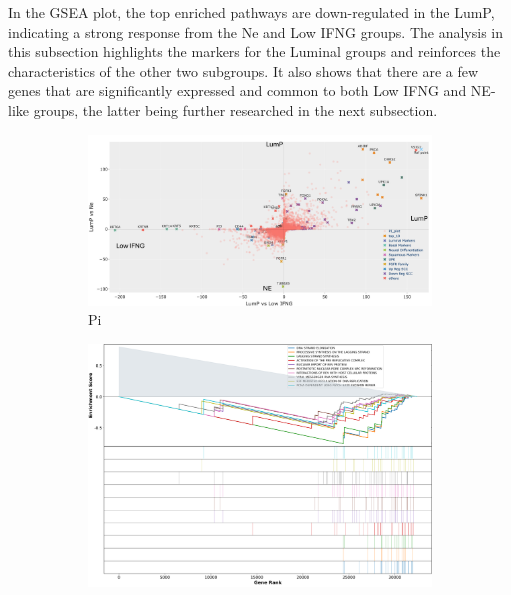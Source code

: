 In the GSEA plot, the top enriched pathways are down-regulated in the LumP, indicating a strong response from the Ne and Low IFNG groups. The analysis in this subsection highlights the markers for the Luminal groups and reinforces the characteristics of the other two subgroups. It also shows that there are a few genes that are significantly expressed and common to both Low IFNG and NE-like groups, the latter being further researched in the next subsection.

\begin{figure}[H]
    \centering
    \captionsetup{font=small} 
    \begin{subfigure}[!t]{1.0\textwidth}
        \includegraphics[width=\textwidth,keepaspectratio]{Sections/ClusteringAnalysis/Resources/discussion/other_groups/lump_pi.png}    
        \caption{Pi}
        \label{fig:cs:lumP_pi}
    \end{subfigure}
    \centering
    \begin{subfigure}[!t]{0.91\textwidth}
        \includegraphics[width=\textwidth, keepaspectratio]{Sections/ClusteringAnalysis/Resources/discussion/other_groups/lumP2_reactome_10_top.png}

\end{subfigure}
\end{figure}
